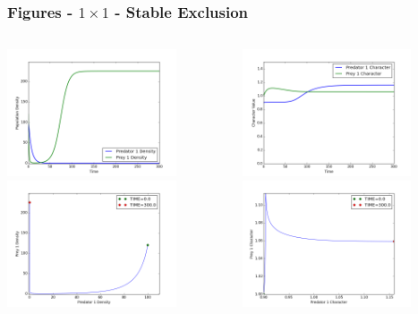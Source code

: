 \documentclass[10pt]{beamer}
\begin{document}
\begin{frame}
	\frametitle{Figures - $1\times1$ - Stable Exclusion}
	\begin{columns}[t]
		\begin{column}{.5\textwidth}
			\centering
			\includegraphics[width=5cm,height=3.75cm]{figures/1x1/variable_growth/stable_exclusion/densities.png}\\
			\includegraphics[width=5cm,height=3.75cm]{figures/1x1/variable_growth/stable_exclusion/density_phase_plane.png}
		\end{column}
		\begin{column}{.5\textwidth}
			\centering
			\includegraphics[width=5cm,height=3.75cm]{figures/1x1/variable_growth/stable_exclusion/traits.png}\\
			\includegraphics[width=5cm,height=3.75cm]{figures/1x1/variable_growth/stable_exclusion/trait_phase_plane.png}
		\end{column}
	\end{columns}
\end{frame}
\end{document}
